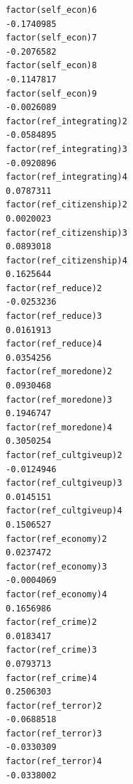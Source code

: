 \documentclass[
]{article}
\begin{document}
\begin{table}
\begin{minipage}[t]{\linewidth}
{\begin{verbatim}
factor(self_econ)6                                                                -0.1740985
factor(self_econ)7                                                                -0.2076582
factor(self_econ)8                                                                -0.1147817
factor(self_econ)9                                                                -0.0026089
factor(ref_integrating)2                                                          -0.0584895
factor(ref_integrating)3                                                          -0.0920896
factor(ref_integrating)4                                                           0.0787311
factor(ref_citizenship)2                                                           0.0020023
factor(ref_citizenship)3                                                           0.0893018
factor(ref_citizenship)4                                                           0.1625644
factor(ref_reduce)2                                                               -0.0253236
factor(ref_reduce)3                                                                0.0161913
factor(ref_reduce)4                                                                0.0354256
factor(ref_moredone)2                                                              0.0930468
factor(ref_moredone)3                                                              0.1946747
factor(ref_moredone)4                                                              0.3050254
factor(ref_cultgiveup)2                                                           -0.0124946
factor(ref_cultgiveup)3                                                            0.0145151
factor(ref_cultgiveup)4                                                            0.1506527
factor(ref_economy)2                                                               0.0237472
factor(ref_economy)3                                                              -0.0004069
factor(ref_economy)4                                                               0.1656986
factor(ref_crime)2                                                                 0.0183417
factor(ref_crime)3                                                                 0.0793713
factor(ref_crime)4                                                                 0.2506303
factor(ref_terror)2                                                               -0.0688518
factor(ref_terror)3                                                               -0.0330309
factor(ref_terror)4                                                               -0.0338002

\end{verbatim}}
\end{minipage}
\end{table}
\end{document}
